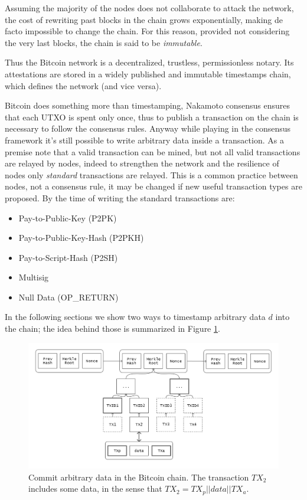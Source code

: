 Assuming the majority of the nodes does not collaborate to attack the network, the cost of rewriting past blocks in the chain grows exponentially, making de facto impossible to change the chain. For this reason, provided not considering the very last blocks, the chain is said to be \textit{immutable}. 

Thus the Bitcoin network is a decentralized, trustless, permissionless notary. Its attestations are stored in a widely published and immutable timestamps chain, which defines the network (and vice versa). 

Bitcoin does something more than timestamping, Nakamoto consensus ensures that each UTXO is spent only once, thus to publish a transaction on the chain is necessary to follow the consensus rules. 
Anyway while playing in the consensus framework it's still possible to write arbitrary data inside a transaction.
As a premise note that a valid transaction can be mined, but not all valid transactions are relayed by nodes, indeed to strengthen the network and the resilience of nodes only \textit{standard} transactions are relayed. This is a common practice between nodes, not a consensus rule, it may be changed if new useful transaction types are proposed. By the time of writing the standard transactions are:
\begin{itemize}
	\item Pay-to-Public-Key (P2PK)
	\item Pay-to-Public-Key-Hash (P2PKH)
	\item Pay-to-Script-Hash (P2SH)
	\item Multisig
	\item Null Data (OP\_RETURN)
\end{itemize}

In the following sections we show two ways to timestamp arbitrary data $d$ into the chain; the idea behind those is summarized in Figure \ref{fig:chain-data}.

\begin{figure}
	\begin{center}
		\includegraphics[width=\linewidth]{Images/bitcoin-chain-data-path.png}
		\caption[Commit arbitrary data in the Bitcoin chain]{Commit arbitrary data in the Bitcoin chain. The transaction $TX_2$ includes some data, in the sense that $TX_2=TX_p||data||TX_a$.}
		\label{fig:chain-data}
	\end{center}
\end{figure}

